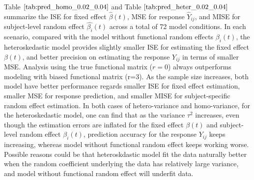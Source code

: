 Table $\ref{tab:pred_homo_0.02_0.04}$ and Table $\ref{tab:pred_heter_0.02_0.04}$ summarize the ISE for fixed effect $\hat{\beta}(t)$, MSE for response $\hat{Y}_{ij}$, and MISE for subject-level random effect $\hat{\beta_i}(t)$ across a total of 72 model conditions. In each scenario, compared with the model without functional random effects $\beta_i(t)$, the heteroskedastic model provides slightly smaller ISE for estimating the fixed effect $\beta(t)$, and better precision on estimating the response $Y_{ij}$ in terms of smaller MSE. Analysis using the true functional matrix ($r=0$) always outperforms modeling with biased functional matrix (r=3). As the sample size increases, both model have better performance regards smaller ISE for fixed effect estimation, smaller MSE for response prediction, and smaller MISE for subject-specific random effect estimation. In both cases of hetero-variance and homo-variance, for the heteroskedastic model, one can find that as the variance $\tau^2$ increases,  even though the estimation errors are inflated for the fixed effect $\beta(t)$ and subject-level random effect $\beta_i(t)$, prediction accuracy for the response $Y_{ij}$ keeps increasing, whereas model without functional random effect keeps working worse. Possible reasons could be that heteroskdastic model fit the data naturally better when the random coefficient underlying the data has relatively large variance, and model without functional random effect will underfit data. 






